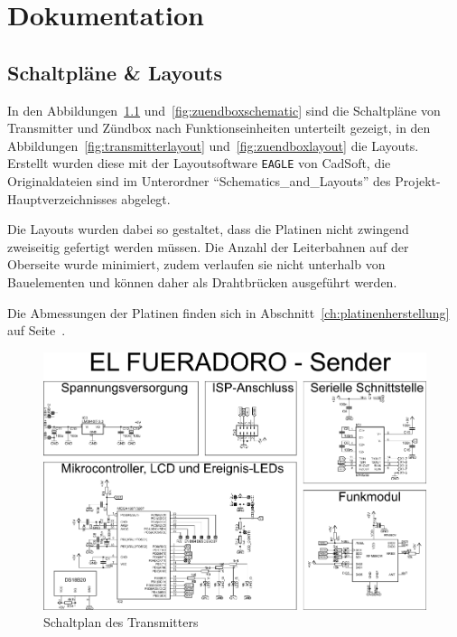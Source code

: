 \documentclass[pdftex, parskip, numbers=noenddot, toc=listof]{scrbook}
\begin{document}
	\part{Dokumentation}
	\label{part:dokumentation}

	\chapter{Schaltpläne \& Layouts}

	In den Abbildungen~\ref{fig:transmitterschematic} und~\ref{fig:zuendboxschematic} sind die Schaltpläne von Transmitter und Zündbox nach Funk\-tions\-ein\-heiten unterteilt gezeigt, in den Abbildungen~\ref{fig:transmitterlayout} und~\ref{fig:zuendboxlayout} die Layouts. Erstellt wurden diese mit der Layoutsoftware \texttt{EAGLE} von CadSoft, die Originaldateien sind im Unterordner \enquote{Schematics\_and\_Layouts} des Projekt-Hauptverzeichnisses abgelegt.

	Die Layouts wurden dabei so gestaltet, dass die Platinen nicht zwingend zweiseitig gefertigt werden müssen. Die Anzahl der Leiterbahnen auf der Oberseite wurde minimiert, zudem verlaufen sie nicht unterhalb von Bauelementen und können daher als Drahtbrücken ausgeführt werden.

	Die Abmessungen der Platinen finden sich in Abschnitt~\ref{ch:platinenherstellung} auf Seite~\pageref{ch:platinenherstellung}.

	\begin{figure}
		\centering
		\includegraphics[angle=-90, width=.9\textwidth, keepaspectratio]{Bilder/Transmitterschaltplan}
		\caption{Schaltplan des Transmitters}
		\label{fig:transmitterschematic}
	\end{figure}
\end{document}

